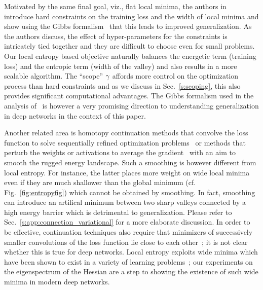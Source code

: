 \documentclass[10pt]{article}
\newcommand{\pc}[2]{{\color{ForestGreen}#1}\marginpar{\tiny\noindent{\raggedright{\color{Sienna}[PC]}\color{Sienna}{#2} \par}}}
\begin{document}
\pc{Motivated by the same final goal, viz., flat local minima, the authors in~\citet{hochreiter1997flat} introduce hard constraints on the training loss and the width of local minima and show using the Gibbs formalism~\citep{haussler1997mutual} that this leads to improved generalization. As the authors discuss, the effect of hyper-parameters for the constraints is intricately tied together and they are difficult to choose even for small problems. Our local entropy based objective naturally balances the energetic term (training loss) and the entropic term (width of the valley) and also results in a more scalable algorithm. The ``scope'' $\gamma$ affords more control on the optimization process than hard constraints and as we discuss in Sec.~\ref{s:scoping}, this also provides significant computational advantages. The Gibbs formalism used in the analysis of~\citet{hochreiter1997flat} is however a very promising direction to understanding generalization in deep networks in the context of this paper.}{While the motivations are exactly the same, the similarities with their formulation are only conceptual in nature, e.g., in a flat minimum, the local entropy is a direct measure of the width of the valley which is similar to their usage of Hessian. The Gibbs variant to averaging in weight space (Eqn. 33, pg. 22 of [HS97]) is similar to the averaging in Eqn. 7 of our paper.}

Another related area is homotopy continuation methods that convolve the loss function to solve sequentially refined optimization problems~\citep{allgower2012numerical,mobahi2015link} or methods that perturb the weights or activations to average the gradient~\citep{gulcehre2016mollifying} with an aim to smooth the rugged energy landscape. Such a smoothing is however different from local entropy. For instance, the latter places more weight on wide local minima even if they are much shallower than the global minimum (cf. Fig.~\ref{fig:entropyfig}) which cannot be obtained by smoothing. In fact, smoothing can introduce an artifical minimum between two sharp valleys connected by a high energy barrier which is detrimental to generalization. Please refer to Sec.~\ref{s:app:connection_variational} for a more elaborate discussion. In order to be effective, continuation techniques also require that minimizers of successively smaller convolutions of the loss function lie close to each other~\citep{DBLP:conf/icml/HazanLS16}; it is not clear whether this is true for deep networks. Local entropy exploits wide minima which have been shown to exist in a variety of learning problems~\citep{monasson1995weight,cocco1996analytical}; our experiments on the eigenspectrum of the Hessian are a step to showing the existence of such wide minima in modern deep networks.
\end{document}
